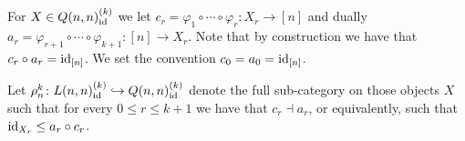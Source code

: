 \documentclass[a4paper,reqno,twoside]{amsart}
\begin{document}
\begin{definition}
	For $X \in Q(n,n)^{(k)}_{\mathrm{id}}$ we let $c_r= \varphi_1 \circ \cdots \circ \varphi_r \colon X_r \to [n]$ and dually $a_r=\varphi_{r+1}\circ \cdots \circ \varphi_{k+1} \colon [n] \to X_r$. Note that by construction we have that $c_r \circ a_r = \mathrm{id}_{[n]}$. We set the convention $c_0=a_0=\mathrm{id}_{[n]}$.
\end{definition}

\begin{definition}
	Let $\rho^k_n \colon L(n,n)_{\mathrm{id}}^{(k)} \hookrightarrow Q(n,n)_{\mathrm{id}}^{(k)}$ denote the full sub-category on those objects $X$ such that for every $0 \leq r \leq k+1$ we have that $c_r \dashv a_r$, or equivalently, such that $\mathrm{id}_{X_{r}} \leq a_r \circ c_r$.
\end{definition}
\end{document}
